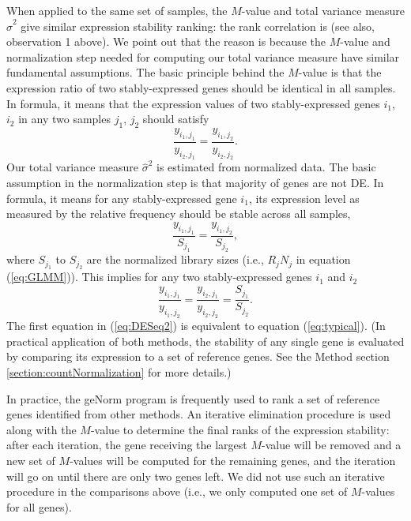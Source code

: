 	When applied to the same set of samples, the $M$-value and total variance
	measure $\hat\sigma^2$ give similar expression stability ranking: the rank
	correlation is \recallrankcorrelation (see also, observation 1 above).
	We point out that the reason is because the $M$-value and normalization step
	needed for computing our total variance measure have similar fundamental
	assumptions. 
	The basic principle
	behind the $M$-value is that the expression ratio of two stably-expressed
	genes should be identical in all samples. In formula, it means that the
	expression values of two stably-expressed genes $i_1$, $i_2$ in any two samples $j_1$, $j_2$
	should satisfy
	\begin{equation}\label{eq:typical}
	\dfrac{y_{i_1, j_1}}{y_{i_2, j_1}} = \dfrac{y_{i_1, j_2}}{y_{i_2, j_2}}.
	\end{equation} 
	Our total variance measure $\hat\sigma^2$ is estimated from normalized data.
	The basic assumption in the normalization step is that majority of genes are
	not DE. In formula, it means for any stably-expressed gene $i_1$, its expression
	level as measured by the relative frequency should be stable across all
	samples,
	\begin{equation}\label{eq:DESeq} 
	\frac{y_{i_1, j_1}}{S_{j_1}}= \dfrac{y_{i_1, j_2}}{S_{j_2}},
	\end{equation}
	where $S_{j_1}$ to $S_{j_2}$ are the normalized library sizes (i.e., $R_j N_j$ in equation 
	(\ref{eq:GLMM})).
	This implies for any two stably-expressed genes $i_1$ and $i_2$
	\begin{equation}\label{eq:DESeq2} 
	\frac{y_{i_1, j_1}}{y_{i_1, j_2}} = \frac{y_{i_2, j_1}}{y_{i_2, j_2}} =
	\frac{S_{j_1}}{S_{j_2}}.
	\end{equation}
	The first equation in (\ref{eq:DESeq2}) is equivalent to equation
	(\ref{eq:typical}). (In practical application of both methods, the stability
	of any single gene is evaluated by comparing its expression to a set of
	reference genes. See the Method section \ref{section:countNormalization} for more details.)
	
	In practice, the geNorm program \citep{vandesompele2002accurate} is frequently
	used to rank a set of reference genes identified from other methods.  An
	iterative elimination procedure is used along with the $M$-value to determine
	the final ranks of the expression stability:  after each iteration, the gene
	receiving the largest $M$-value will be removed and a new set of $M$-values
	will be computed for the remaining genes, and the iteration will go on until
	there are only two genes left.  We did not use such an iterative procedure in
	the comparisons above (i.e., we only computed one set of $M$-values for all
	genes). 
	
